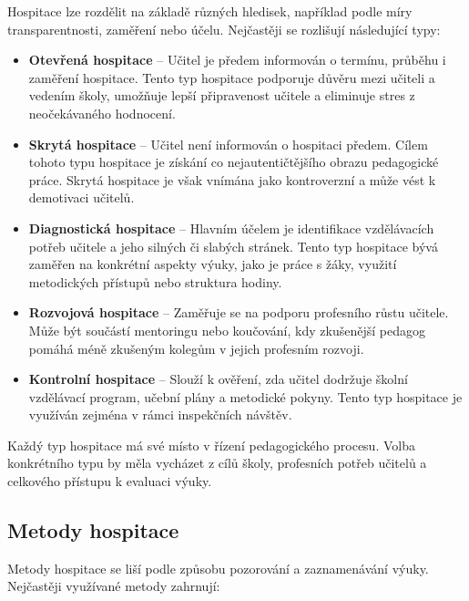 Hospitace lze rozdělit na základě různých hledisek, například podle míry transparentnosti, zaměření nebo účelu. Nejčastěji se rozlišují následující typy:

\begin{itemize}
    \item \textbf{Otevřená hospitace} – Učitel je předem informován o termínu, průběhu i zaměření hospitace. Tento typ hospitace podporuje důvěru mezi učiteli a vedením školy, umožňuje lepší připravenost učitele a eliminuje stres z neočekávaného hodnocení.
    \item \textbf{Skrytá hospitace} – Učitel není informován o hospitaci předem. Cílem tohoto typu hospitace je získání co nejautentičtějšího obrazu pedagogické práce. Skrytá hospitace je však vnímána jako kontroverzní a může vést k demotivaci učitelů.
    \item \textbf{Diagnostická hospitace} – Hlavním účelem je identifikace vzdělávacích potřeb učitele a jeho silných či slabých stránek. Tento typ hospitace bývá zaměřen na konkrétní aspekty výuky, jako je práce s žáky, využití metodických přístupů nebo struktura hodiny.
    \item \textbf{Rozvojová hospitace} – Zaměřuje se na podporu profesního růstu učitele. Může být součástí mentoringu nebo koučování, kdy zkušenější pedagog pomáhá méně zkušeným kolegům v jejich profesním rozvoji.
    \item \textbf{Kontrolní hospitace} – Slouží k ověření, zda učitel dodržuje školní vzdělávací program, učební plány a metodické pokyny. Tento typ hospitace je využíván zejména v rámci inspekčních návštěv.
\end{itemize}

Každý typ hospitace má své místo v řízení pedagogického procesu. Volba konkrétního typu by měla vycházet z cílů školy, profesních potřeb učitelů a celkového přístupu k evaluaci výuky.

\subsection{Metody hospitace}

Metody hospitace se liší podle způsobu pozorování a zaznamenávání výuky. Nejčastěji využívané metody zahrnují:

